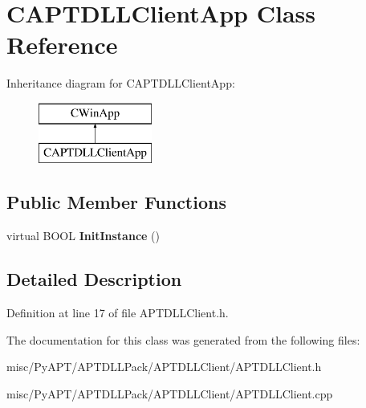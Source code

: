 \hypertarget{class_c_a_p_t_d_l_l_client_app}{}\section{C\+A\+P\+T\+D\+L\+L\+Client\+App Class Reference}
\label{class_c_a_p_t_d_l_l_client_app}
Inheritance diagram for C\+A\+P\+T\+D\+L\+L\+Client\+App\+:\begin{figure}[H]
\begin{center}
\leavevmode
\includegraphics[height=2.000000cm]{class_c_a_p_t_d_l_l_client_app}
\end{center}
\end{figure}
\subsection*{Public Member Functions}
\begin{DoxyCompactItemize}
\item 
virtual B\+O\+OL {\bfseries Init\+Instance} ()\hypertarget{class_c_a_p_t_d_l_l_client_app_aa0cdfa59056f2cd037c7f6af76c267e6}{}\label{class_c_a_p_t_d_l_l_client_app_aa0cdfa59056f2cd037c7f6af76c267e6}

\end{DoxyCompactItemize}


\subsection{Detailed Description}


Definition at line 17 of file A\+P\+T\+D\+L\+L\+Client.\+h.



The documentation for this class was generated from the following files\+:\begin{DoxyCompactItemize}
\item 
misc/\+Py\+A\+P\+T/\+A\+P\+T\+D\+L\+L\+Pack/\+A\+P\+T\+D\+L\+L\+Client/A\+P\+T\+D\+L\+L\+Client.\+h\item 
misc/\+Py\+A\+P\+T/\+A\+P\+T\+D\+L\+L\+Pack/\+A\+P\+T\+D\+L\+L\+Client/A\+P\+T\+D\+L\+L\+Client.\+cpp\end{DoxyCompactItemize}
